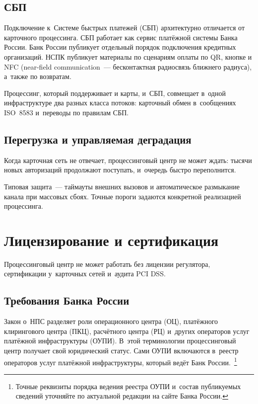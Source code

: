 \subsection*{СБП}

Подключение к~Системе быстрых платежей (СБП) архитектурно отличается от карточного
процессинга. СБП работает как сервис платёжной системы Банка России.
Банк России публикует отдельный порядок подключения кредитных
организаций. НСПК публикует материалы по сценариям оплаты по QR,
кнопке и NFC (near-field communication~--- бесконтактная радиосвязь ближнего радиуса), а~также по возвратам.~\cite{cbr-sbp-actions,sbp-main,sbp-faq-business}

Процессинг, который поддерживает и карты, и~СБП,
совмещает в~одной инфраструктуре два разных класса потоков:
карточный обмен в~сообщениях ISO~8583 и~переводы по правилам
СБП.~\cite{cbr-sbp-actions,sbp-main}

\subsection*{Перегрузка и управляемая деградация}

Когда карточная сеть не отвечает, процессинговый центр не может
ждать: тысячи новых авторизаций продолжают поступать,
и~очередь быстро переполнится.

Типовая защита~--- таймауты внешних вызовов и автоматическое
размыкание канала при массовых сбоях. Точные пороги задаются
конкретной реализацией процессинга.

\section{Лицензирование и сертификация}\label{sec:pc-licensing}

Процессинговый центр не может работать без лицензии
регулятора, сертификации у~карточных сетей и~аудита PCI DSS.

\subsection*{Требования Банка России}

Закон о~НПС разделяет роли операционного центра (ОЦ),
платёжного клирингового центра (ПКЦ), расчётного центра (РЦ)
и~других операторов услуг платёжной инфраструктуры (ОУПИ).
В~этой терминологии процессинговый центр получает
свой юридический статус. Сами ОУПИ включаются в~реестр
операторов услуг платёжной инфраструктуры, который ведёт
Банк России.~\cite{fz-161,cbr-ps-glossary}\footnote{Точные
реквизиты порядка ведения реестра ОУПИ и~состав публикуемых
сведений уточняйте по актуальной редакции на сайте Банка России.}

